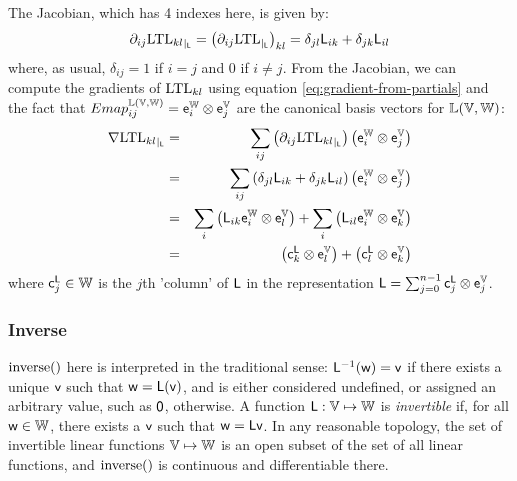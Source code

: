 The Jacobian, which has 4 indexes here, is given by:
\begin{equation}
{\partial}_{ij}{\mathrm{LTL}_{kl}}_{\mid_{\mathsf{L}}}
 =
\left( {\partial}_{ij}{\mathrm{LTL}}_{\mid_{\mathsf{L}}} \right)_{kl}
=
\delta_{jl} \mathsf{L}_{ik}
+
\delta_{jk} \mathsf{L}_{il}
\end{equation}
where, as usual, $\delta_{ij} = 1$ if $i=j$ and  $0$ if $i \neq j$.
From the Jacobian, we can compute the gradients of $\mathrm{LTL}_{kl}$
using equation \ref{eq:gradient-from-partials}
and the fact that
$Emap_{ij}^{\mathbb{L}(\mathbb{V},\mathbb{W})}  = \mathsf{e}_i^{\mathbb{W}} \otimes \mathsf{e}_j^{\mathbb{V}}$
are the canonical basis vectors for $\mathbb{L}(\mathbb{V},\mathbb{W})$:
\begin{eqnarray}
{\mathbf \nabla}{\mathrm{LTL}_{kl}}_{\mid_{\mathsf{L}}}
& = &
\sum_{ij}
\left( {\partial}_{ij}{\mathrm{LTL}_{kl}}_{\mid_{\mathsf{L}}} \right)
\left( \mathsf{e}_i^{\mathbb{W}} \otimes \mathsf{e}_j^{\mathbb{V}} \right)
\\
& = &
\sum_{ij}
\left( \delta_{jl} \mathsf{L}_{ik} + \delta_{jk} \mathsf{L}_{il} \right)
\left( \mathsf{e}_i^{\mathbb{W}} \otimes \mathsf{e}_j^{\mathbb{V}} \right)
\nonumber
\\
& = &
\sum_{i}
\left(
\mathsf{L}_{ik}  \mathsf{e}_i^{\mathbb{W}} \otimes \mathsf{e}_l^{\mathbb{V}}
\right)
+
\sum_{i}
\left(
\mathsf{L}_{il}  \mathsf{e}_i^{\mathbb{W}} \otimes \mathsf{e}_k^{\mathbb{V}}
\right)
\nonumber
\\
& = &
\left(
\mathsf{c}_k^{\mathsf{L}} \otimes \mathsf{e}_l^{\mathbb{V}}
\right)
+
\left(
\mathsf{c}_l^{\mathsf{L}} \otimes \mathsf{e}_k^{\mathbb{V}}
\right)
\nonumber
\end{eqnarray}
where $\mathsf{c}_j^{\mathsf{L}} \in \mathbb{W}$ is the $j$th 'column' of $\mathsf{L}$
in the representation
$\mathsf{L} = \sum_{j=0}^{n-1} \mathsf{c}_j^{\mathsf{L}} \otimes \mathsf{e}_j^{\mathbb{V}}$.


\subsubsection{Inverse}
\label{sec:Inverse}

$\mathrm{inverse}()$ here is interpreted in the traditional sense:
$\mathsf{L}^{-1}(\mathsf{w}) = \mathsf{v}$ if there exists a unique $\mathsf{v}$ such that $\mathsf{w} = \mathsf{L}(\mathsf{v})$,
and is either considered undefined, or assigned an arbitrary
value, such as ${\mathsf 0}$, otherwise.
A function $\mathsf{L} : \mathbb{V} \mapsto \mathbb{W}$ is {\it invertible}
if, for all $\mathsf{w} \in \mathbb{W}$, there exists a $\mathsf{v}$ such that
$\mathsf{w} = \mathsf{L} \mathsf{v}$.
In any reasonable topology,
the set of invertible linear functions $\mathbb{V} \mapsto \mathbb{W}$
is an open subset of the set of all linear functions,
and $\mathrm{inverse}()$ is continuous and differentiable there.

